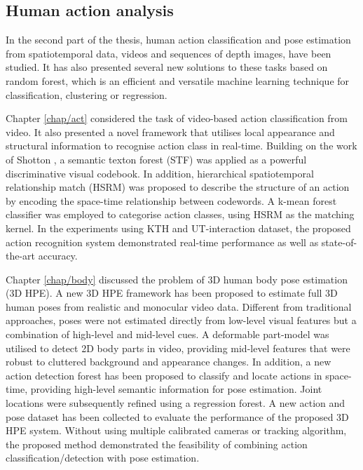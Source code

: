 \subsection{Human action analysis}

In the second part of the thesis, human action classification and pose estimation from spatiotemporal data, \eg videos and sequences of depth images, have been studied. 
It has also presented several new solutions to these tasks based on random forest, which is an efficient and versatile machine learning technique for classification, clustering or regression. 

Chapter \ref{chap/act} considered the task of video-based action classification from video. It also presented a novel framework that utilises local appearance and structural information to recognise action class in real-time. Building on the work of Shotton \etal \cite{Shotton2008}, a semantic texton forest (STF) was applied as a powerful discriminative visual codebook. In addition, hierarchical spatiotemporal relationship match (HSRM) was proposed to describe the structure of an action by encoding the space-time relationship between codewords. A k-mean forest classifier was employed to categorise action classes, using HSRM as the matching kernel.   
In the experiments using KTH and UT-interaction dataset, the proposed action recognition system demonstrated real-time performance as well as state-of-the-art accuracy. 

Chapter \ref{chap/body} discussed the problem of 3D human body pose estimation (3D HPE).
A new 3D HPE framework has been proposed to estimate full 3D human poses from realistic and monocular video data. Different from traditional approaches, poses were not estimated directly from low-level visual features but a combination of high-level and mid-level cues. 
A deformable part-model was utilised to detect 2D body parts in video, providing mid-level features that were robust to cluttered background and appearance changes. In addition, a new action detection forest has been proposed to classify and locate actions in space-time, providing high-level semantic information for pose estimation. Joint locations were subsequently refined using a regression forest. A new action and pose dataset has been collected to evaluate the performance of the proposed 3D HPE system. Without using multiple calibrated cameras or tracking algorithm, the proposed method demonstrated the feasibility of combining action classification/detection with pose estimation.  

